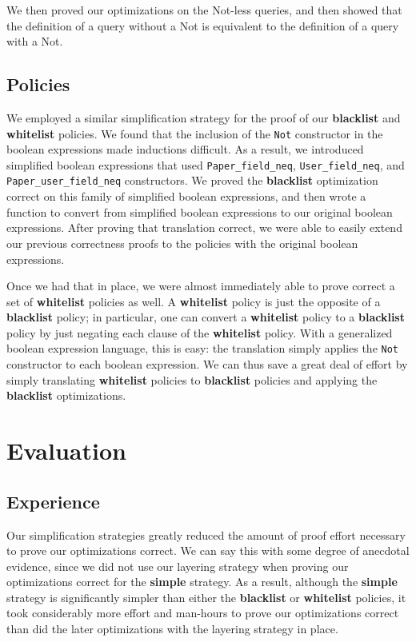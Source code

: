 \documentclass[11pt,journal]{IEEEtran}
\begin{document}
We then proved our optimizations on the Not-less queries, and then showed that the definition of a query without a Not is equivalent to the definition of a query with a Not.

\subsection{Policies}
\label{sec:policy_proofs}
We employed a similar simplification strategy for the proof of our \textbf{blacklist} and \textbf{whitelist} policies.  We found that the inclusion of the \texttt{Not} constructor in the boolean expressions made inductions difficult.  As a result, we introduced simplified boolean expressions that used \texttt{Paper\_field\_neq}, \texttt{User\_field\_neq}, and \texttt{Paper\_user\_field\_neq} constructors.  We proved the \textbf{blacklist} optimization correct on this family of simplified boolean expressions, and then wrote a function to convert from simplified boolean expressions to our original boolean expressions.  After proving that translation correct, we were able to easily extend our previous correctness proofs to the policies with the original boolean expressions.

Once we had that in place, we were almost immediately able to prove correct a set of \textbf{whitelist} policies as well.  A \textbf{whitelist} policy is just the opposite of a \textbf{blacklist} policy; in particular, one can convert a \textbf{whitelist} policy to a \textbf{blacklist} policy by just negating each clause of the \textbf{whitelist} policy.  With a generalized boolean expression language, this is easy: the translation simply applies the \texttt{Not} constructor to each boolean expression.  We can thus save a great deal of effort by simply translating \textbf{whitelist} policies to \textbf{blacklist} policies and applying the \textbf{blacklist} optimizations.

\section{Evaluation}
\label{sec:evaluation}

\subsection{Experience}
\label{sec:experience}
Our simplification strategies greatly reduced the amount of proof effort necessary to prove our optimizations correct.  We can say this with some degree of anecdotal evidence, since we did not use our layering strategy when proving our optimizations correct for the \textbf{simple} strategy.  As a result, although the \textbf{simple} strategy is significantly simpler than either the \textbf{blacklist} or \textbf{whitelist} policies, it took considerably more effort and man-hours to prove our optimizations correct than did the later optimizations with the layering strategy in place.
\end{document}
